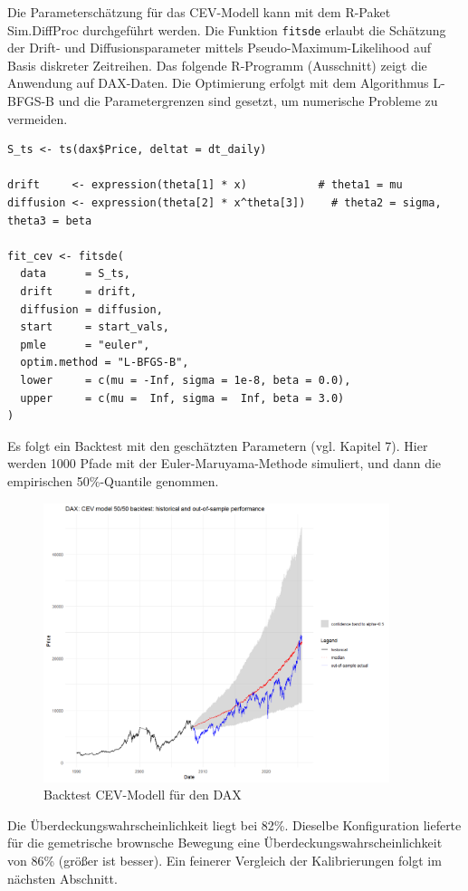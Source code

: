 \begin{bsp}
Die Parameterschätzung für das CEV-Modell kann mit dem R-Paket Sim.DiffProc durchgeführt werden. Die 
Funktion \texttt{fitsde} erlaubt die Schätzung der Drift- und Diffusionsparameter mittels 
Pseudo-Maximum-Likelihood auf Basis diskreter Zeitreihen. Das folgende R-Programm (Ausschnitt) zeigt die Anwendung auf DAX-Daten.
Die Optimierung erfolgt mit dem Algorithmus L-BFGS-B und die Parametergrenzen sind gesetzt, um numerische Probleme zu vermeiden.

\begin{lstlisting}
S_ts <- ts(dax$Price, deltat = dt_daily)

drift     <- expression(theta[1] * x)           # theta1 = mu
diffusion <- expression(theta[2] * x^theta[3])    # theta2 = sigma, theta3 = beta

fit_cev <- fitsde(
  data      = S_ts,
  drift     = drift,
  diffusion = diffusion,
  start     = start_vals,
  pmle      = "euler",
  optim.method = "L-BFGS-B",
  lower     = c(mu = -Inf, sigma = 1e-8, beta = 0.0),
  upper     = c(mu =  Inf, sigma =  Inf, beta = 3.0)
)
\end{lstlisting}

Es folgt ein Backtest mit den geschätzten Parametern (vgl. Kapitel 7). Hier werden 1000 Pfade mit der
Euler-Maruyama-Methode simuliert, und dann die empirischen 50\%-Quantile genommen.

\begin{figure}[H]
    \centering
    \includegraphics[width=0.9\textwidth]{images/cev_dax_backtest.png}
    \caption{Backtest CEV-Modell für den DAX}
    \label{fig:cev_dax_backtest}
\end{figure}

Die Überdeckungswahrscheinlichkeit liegt bei 82\%. Dieselbe Konfiguration
lieferte für die gemetrische brownsche Bewegung eine Überdeckungswahrscheinlichkeit von 86\% (größer ist besser).
Ein feinerer Vergleich der Kalibrierungen folgt im nächsten Abschnitt. 

\end{bsp}

